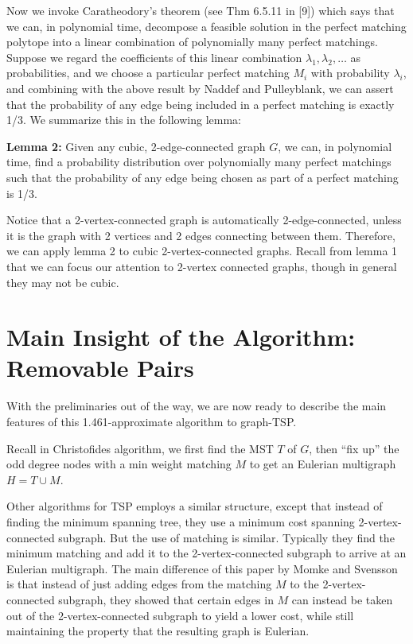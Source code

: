 \documentclass[12pt]{article}
\begin{document}
Now we invoke Caratheodory's theorem (see Thm 6.5.11 in [9]) which says that we can, in polynomial time, decompose a feasible solution in the perfect matching polytope into a linear combination of polynomially many perfect matchings. Suppose we regard the coefficients of this linear combination $\lambda_1, \lambda_2,\ldots$ as probabilities, and we choose a particular perfect matching $M_i$ with probability $\lambda_i$, and combining with the above result by Naddef and Pulleyblank, we can assert that the probability of any edge being included in a perfect matching is exactly 1/3. We summarize this in the following lemma:

{\bf Lemma 2:} Given any cubic, 2-edge-connected graph $G$, we can, in polynomial time, find a probability distribution over polynomially many perfect matchings such that the probability of any edge being chosen as part of a perfect matching is 1/3.

Notice that a 2-vertex-connected graph is automatically 2-edge-connected, unless it is the graph with 2 vertices and 2 edges connecting between them. Therefore, we can apply lemma 2 to cubic 2-vertex-connected graphs. Recall from lemma 1 that we can focus our attention to 2-vertex connected graphs, though in general they may not be cubic.

\section{Main Insight of the Algorithm: Removable Pairs}

With the preliminaries out of the way, we are now ready to describe the main features of this 1.461-approximate algorithm to graph-TSP.

Recall in Christofides algorithm, we first find the MST $T$ of $G$, then ``fix up'' the odd degree nodes with a min weight matching $M$ to get an Eulerian multigraph $H = T\cup M$. 

Other algorithms for TSP employs a similar structure, except that instead of finding the minimum spanning tree, they use a minimum cost spanning 2-vertex-connected subgraph. But the use of matching is similar. Typically they find the minimum matching and add it to the 2-vertex-connected subgraph to arrive at an Eulerian multigraph. The main difference of this paper by Momke and Svensson is that instead of just adding edges from the matching $M$ to the 2-vertex-connected subgraph, they showed that certain edges in $M$ can instead be taken out of the 2-vertex-connected subgraph to yield a lower cost, while still maintaining the property that the resulting graph is Eulerian.
\end{document}
